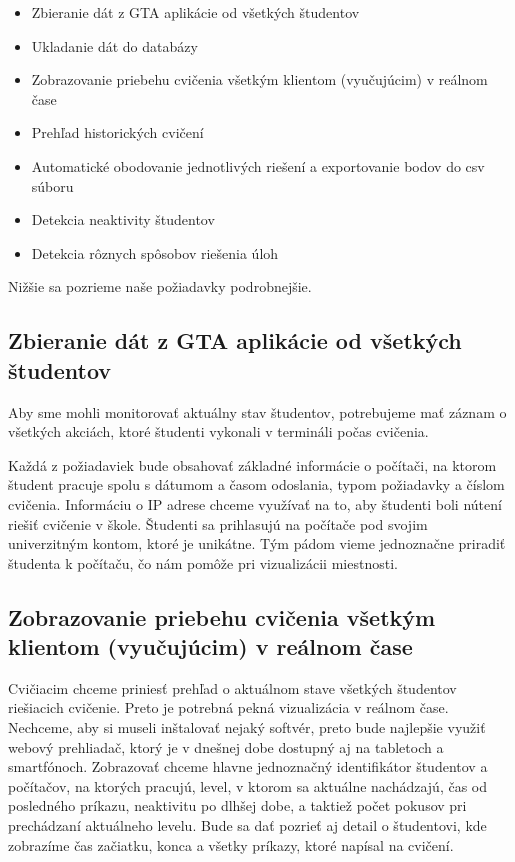\begin{itemize}
	\item Zbieranie dát z GTA aplikácie od všetkých študentov
	\item Ukladanie dát do databázy
	\item Zobrazovanie priebehu cvičenia všetkým klientom (vyučujúcim) v reálnom čase
	\item Prehľad historických cvičení
	\item Automatické obodovanie jednotlivých riešení a exportovanie bodov do csv súboru
	\item Detekcia neaktivity študentov
	\item Detekcia rôznych spôsobov riešenia úloh
\end{itemize}

Nižšie sa pozrieme naše požiadavky podrobnejšie.

\subsection{Zbieranie dát z GTA aplikácie od všetkých študentov}
\label{sec:apprequirements:gtadata}

Aby sme mohli monitorovať aktuálny stav študentov, potrebujeme mať záznam o
všetkých akciách, ktoré študenti vykonali v termináli počas cvičenia.

Každá z požiadaviek bude obsahovať základné informácie o počítači, na ktorom
študent pracuje spolu s dátumom a časom odoslania, typom požiadavky a číslom cvičenia.
Informáciu o IP adrese chceme využívať na to, aby študenti boli nútení
riešiť cvičenie v škole.
Študenti sa prihlasujú na počítače pod svojim univerzitným kontom, ktoré je unikátne.
Tým pádom vieme jednoznačne priradiť študenta k počítaču, čo nám pomôže pri
vizualizácii miestnosti.


\subsection{Zobrazovanie priebehu cvičenia všetkým klientom (vyučujúcim) v reálnom čase}
\label{sec:apprequirements:visualization}

Cvičiacim chceme priniesť prehľad o aktuálnom stave všetkých študentov riešiacich
cvičenie. Preto je potrebná pekná vizualizácia v reálnom čase.
Nechceme, aby si museli inštalovať nejaký softvér, preto bude najlepšie využiť webový prehliadač, ktorý je v dnešnej dobe dostupný aj na tabletoch a smartfónoch.
Zobrazovať chceme hlavne jednoznačný identifikátor študentov a počítačov, na ktorých
pracujú, level, v ktorom
sa aktuálne nachádzajú, čas od posledného príkazu, neaktivitu po dlhšej dobe,
a taktiež počet pokusov pri prechádzaní aktuálneho levelu. Bude sa dať pozrieť
aj detail o študentovi, kde zobrazíme čas začiatku, konca a všetky príkazy, ktoré
napísal na cvičení.

